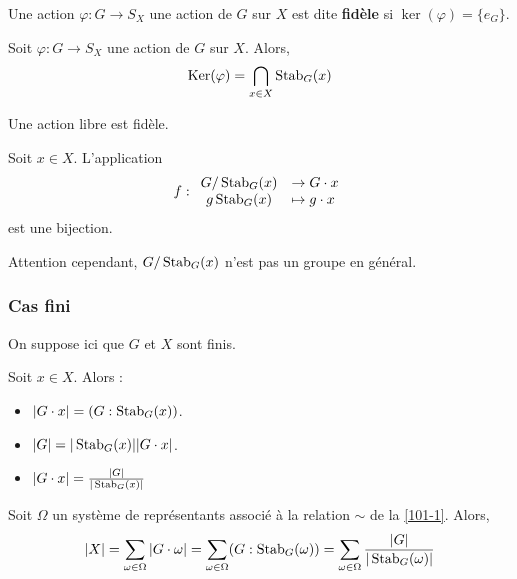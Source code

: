 
	\begin{definition}
		Une action  $\varphi : G \rightarrow S_X$ une action de $G$ sur $X$ est dite \textbf{fidèle} si $\ker(\varphi) = \{ e_G \}$.
	\end{definition}

	\begin{proposition}
		Soit $\varphi : G \rightarrow S_X$ une action de $G$ sur $X$. Alors,
		\[ \mathrm{Ker}(\varphi) = \bigcap_{x \in X} \operatorname{Stab}_G(x) \]
	\end{proposition}

	\begin{corollary}
		Une action libre est fidèle.
	\end{corollary}


	\begin{proposition}
		Soit $x \in X$. L'application
		\[ f :
		\begin{array}{cl}
			 G/\operatorname{Stab}_G(x) &\rightarrow G \cdot x \\
			 g \operatorname{Stab}_G(x) &\mapsto g \cdot x
		\end{array}
		\]
		est une bijection.
	\end{proposition}

	\begin{remark}
		Attention cependant, $G/\operatorname{Stab}_G(x)$ n'est pas un groupe en général.
	\end{remark}
	
	\subsubsection{Cas fini}
	
	On suppose ici que $G$ et $X$ sont finis.
	
	\begin{proposition}
		Soit $x \in X$. Alors :
		\begin{itemize}
			\item $|G \cdot x| = (G : \operatorname{Stab}_G(x))$.
			\item $|G| = |\operatorname{Stab}_G(x)| |G \cdot x|$.
			\item $|G \cdot x| = \frac{|G|}{|\operatorname{Stab}_G(x)|}$
		\end{itemize}
	\end{proposition}

	\begin{theorem}
		Soit $\Omega$ un système de représentants associé à la relation $\sim$ de la \cref{101-1}. Alors,
		\[ |X| = \sum_{\omega \in \Omega} |G \cdot \omega| = \sum_{\omega \in \Omega} (G : \operatorname{Stab}_G(\omega)) = \sum_{\omega \in \Omega} \frac{|G|}{|\operatorname{Stab}_G(\omega)|} \]
	\end{theorem}

